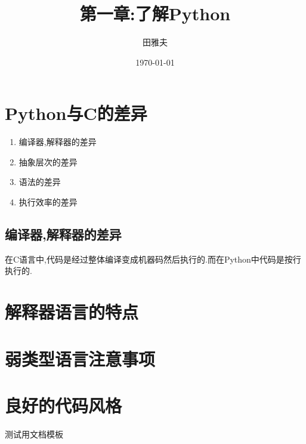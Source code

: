 \documentclass[12pt,a4paper]{article}
\title{第一章:了解Python}	%
\author{田雅夫}
\date{\today}
\begin{document}
\maketitle
\begin{figure}[P]
\centering
\tableofcontents
\end{figure}

\section{Python与C的差异}
\begin{enumerate}
\item 编译器,解释器的差异
\item 抽象层次的差异
\item 语法的差异%
\item 执行效率的差异
\end{enumerate}

\subsection{编译器,解释器的差异}
在C语言中,代码是经过整体编译变成机器码然后执行的.而在Python中代码是按行执行的.

\section{解释器语言的特点}

\section{弱类型语言注意事项}

\section{良好的代码风格}


测试用文档模板
    
\end{document}
